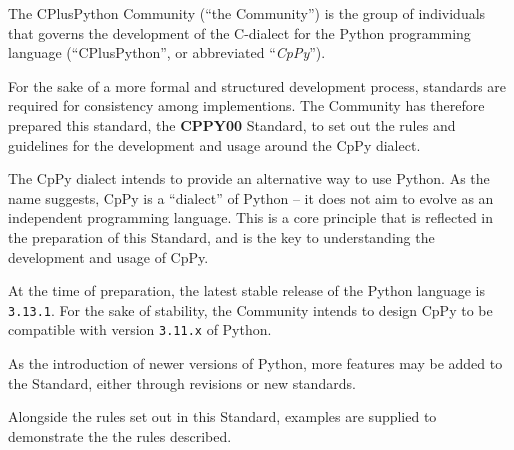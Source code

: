 
The CPlusPython Community (``the Community'') is the group of individuals that governs
the development of the C-dialect for the Python programming language (``CPlusPython'',
or abbreviated ``\textit{CpPy}'').

For the sake of a more formal and structured development process, standards are
required for consistency among implementions. The Community has therefore prepared this
standard, the \textbf{CPPY00} Standard, to set out the rules and guidelines for the
development and usage around the CpPy dialect.

The CpPy dialect intends to provide an alternative way to use Python. As the name
suggests, CpPy is a ``dialect'' of Python -- it does not aim to evolve as an independent
programming language. This is a core principle that is reflected in the preparation of
this Standard, and is the key to understanding the development and usage of CpPy.

At the time of preparation, the latest stable release of the Python language is
\texttt{3.13.1}. For the sake of stability, the Community intends to design CpPy to be
compatible with version \texttt{3.11.x} of Python.

As the introduction of newer versions of Python, more features may be added to the
Standard, either through revisions or new standards.

Alongside the rules set out in this Standard, examples are supplied to demonstrate the
the rules described.
